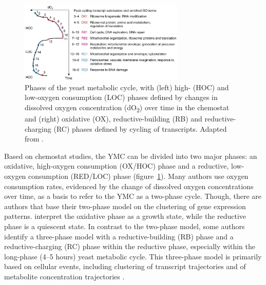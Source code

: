 \begin{figure}
  \centering
  \includegraphics[width=0.7\textwidth]{mellorMolecularBasisMetabolic2016_3c_adapted}
  \caption{
    Phases of the yeast metabolic cycle,
    with (left) high- (HOC) and low-oxygen consumption (LOC) phases defined by changes in dissolved oxygen concentration (dO\textsubscript{2}) over time in the chemostat
    and (right) oxidative (OX), reductive-building (RB) and reductive-charging (RC) phases defined by cycling of transcripts.
    Adapted from \citet{mellorMolecularBasisMetabolic2016}.}
  \label{fig:intro-ymc-overview}
\end{figure}

Based on chemostat studies,
the YMC can be divided into two major phases: an oxidative, high-oxygen consumption (OX/HOC) phase and a reductive, low-oxygen consumption (RED/LOC) phase (figure~\ref{fig:intro-ymc-overview}).
Many authors \citep{slavovMetabolicCyclingCell2011, murrayRedoxRegulationRespiring2011, caustonMetabolicRhythmsFramework2018} use oxygen consumption rates, evidenced by the change of dissolved oxygen concentrations over time, as a basis to refer to the YMC as a two-phase cycle.
Though, there are authors \citep{machneYinYangYeast2012} that base their two-phase model on the clustering of gene expression patterns.
\citet{krishnaMinimalPushPull2018} interpret the oxidative phase as a growth state, while the reductive phase is a quiescent state.
In contrast to the two-phase model, some authors identify a three-phase model with a reductive-building (RB) phase and a reductive-charging (RC) phase within the reductive phase, especially within the long-phase (4--5 hours) yeast metabolic cycle.
This three-phase model is primarily based on cellular events, including clustering of transcript trajectories \citep{tuLogicYeastMetabolic2005} and of metabolite concentration trajectories \citep{tuCyclicChangesMetabolic2007}.

